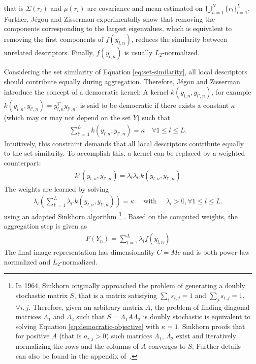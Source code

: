 that is $\Sigma(r_l)$ and $\mu(r_l)$ are covariance and mean estimated on $\bigcup_{n = 1}^N\{r_l\}_{l = 1}^L$. Further, J{\'e}gou and Zisserman experimentally show that removing the components corresponding to the largest eigenvalues, which is equivalent to removing the first components of $f(y_{l,n})$, reduces the similarity between unrelated descriptors. Finally, $f(y_{l,n})$ is usually $L_2$-normalized.

Considering the set similarity of Equation \eqref{eq:set-similarity}, all local descriptors should contribute equally during aggregation. Therefore, J{\'e}gou and Zisserman introduce the concept of a democratic kernel: A kernel $k(y_{l,n}, y_{l',n})$, for example $k(y_{l,n}, y_{l',n}) = y_{l,n}^Ty_{l',n}$, is said to be democratic if there exists a constant $\kappa$ (which may or may not depend on the set $Y$) such that
\begin{align}
    \sum_{l' = 1}^L k(y_{l,n}, y_{l',n}) = \kappa \quad\forall 1 \leq l \leq L.
\end{align}
Intuitively, this constraint demands that all local descriptors contribute equally to the set similarity. To accomplish this, a kernel can be replaced by a weighted counterpart:
\begin{align}
    k'(y_{l,n},y_{l',n}) = \lambda_l \lambda_{l'} k(y_{l,n},y_{l',n})
\end{align}
The weights are learned by solving
\begin{align}
    \lambda_l \left(\sum_{l' = 1}^L \lambda_{l'} k(y_{l,n},y_{l',n})\right) = \kappa \quad\text{ with }\quad \lambda_l > 0, \forall 1 \leq l \leq L.\label{eq:democratic-objective}
\end{align}
using an adapted Sinkhorn algorithm
\footnote{
    In 1964, Sinkhorn \cite{Sinkhorn:1964} originally approached the problem of generating a doubly stochastic matrix $S$, that is a matrix satisfying $\sum_i s_{i,j} = 1$ and $\sum_j s_{i,j} = 1$, $\forall i,j$. Therefore, given an arbitrary matrix $A$, the problem of finding diagonal matrices $\Lambda_1$ and $\Lambda_2$ such that $S = \Lambda_1 A \Lambda_2$ is doubly stochastic is equivalent to solving Equation \eqref{eq:democratic-objective} with $\kappa = 1$. Sinkhorn proofs that for positive $A$ (that is $a_{i,j} > 0$) such matrices $\Lambda_1$, $\Lambda_2$ exist and iteratively normalizing the rows and the columns of $A$ converges to $S$. Further details can also be found in the appendix of~\cite{JegouZisserman:2014}.
} \cite{Sinkhorn:1964}. Based on the computed weights, the aggregation step is given as
\begin{align}
    F(Y_n) = \sum_{l = 1}^L \lambda_l f(y_{l,n})
\end{align}
The final image representation has dimensionality $C = Mc$ and is both power-law normalized and $L_2$-normalized.

